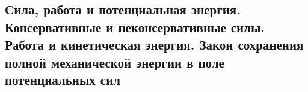 \subsection{Сила, работа и потенциальная энергия. Консервативные и неконсервативные силы. Работа и кинетическая энергия. Закон сохранения полной механической энергии в поле потенциальных сил}